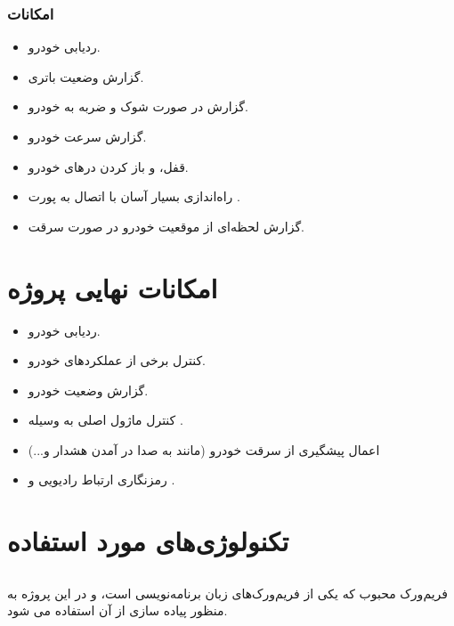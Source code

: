 \documentclass[a4paper,12pt]{report}
\begin{document}
	\subsubsection{
		امکانات
	}\label{subsubsec3:subsec3:sec3:chap1}
	\begin{itemize}[nosep]\label{item1:subsec3:sec2:chap1}
		\item
			ردیابی خودرو.
		\item
			گزارش وضعیت باتری.
		\item
			گزارش در صورت شوک و ضربه به خودرو.
		\item
			گزارش سرعت خودرو.
		\item
			قفل، و باز کردن در‌های خودرو.
		\item
			راه‌اندازی بسیار آسان با اتصال به پورت
			.
		\item
			گزارش لحظه‌ای از موقعیت خودرو در صورت سرقت.

	\end{itemize}

	\section{
	امکانات نهایی پروژه
	}\label{sec4:chap1}
	\begin{itemize}[nosep]\label{item1:sec4:chap1}
		\item
			ردیابی خودرو.
		\item
			کنترل برخی از عملکرد‌های خودرو.
		\item
			گزارش وضعیت خودرو.
		\item
			کنترل ماژول اصلی به وسیله
			.
		\item
			اعمال پیشگیری از سرقت خودرو (مانند به صدا در آمدن هشدار و...)
		\item
			رمزنگاری ارتباط رادیویی و
			.
	\end{itemize}
	\section{
		تکنولوژی‌های مورد استفاده
	}\label{sec5:chap1}

	\subsection{
		}\label{subsec1:sec5:chap1}
		فریم‌ورک
		محبوب
		که یکی از فریم‌ورک‌های زبان برنامه‌نویسی
		است، و در این پروژه به منظور پیاده سازی
		از آن استفاده می شود.
\end{document}
